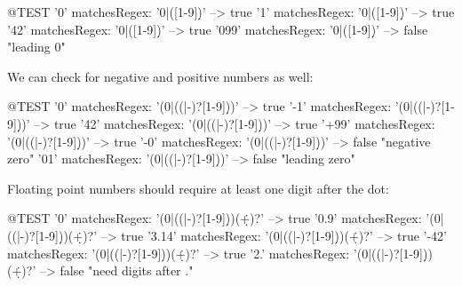\documentclass[a4paper,10pt,twoside]{book}
\begin{document}
{\begin{code}{@TEST}
'0' matchesRegex: '0|([1-9]\d*)'     --> true
'1' matchesRegex: '0|([1-9]\d*)'     --> true
'42' matchesRegex: '0|([1-9]\d*)'   --> true
'099' matchesRegex: '0|([1-9]\d*)' --> false    "leading 0"
\end{code}

We can check for negative and positive numbers as well:

\begin{code}{@TEST}
'0' matchesRegex: '(0|((\+|-)?[1-9]\d*))'     --> true
'-1' matchesRegex: '(0|((\+|-)?[1-9]\d*))'   --> true
'42' matchesRegex: '(0|((\+|-)?[1-9]\d*))'   --> true
'+99' matchesRegex: '(0|((\+|-)?[1-9]\d*))' --> true
'-0' matchesRegex: '(0|((\+|-)?[1-9]\d*))'   --> false    "negative zero"
'01' matchesRegex: '(0|((\+|-)?[1-9]\d*))'   --> false    "leading zero"
\end{code}

Floating point numbers should require at least one digit after the dot:

\begin{code}{@TEST}
'0' matchesRegex: '(0|((\+|-)?[1-9]\d*))(\.\d+)?'      --> true
'0.9' matchesRegex: '(0|((\+|-)?[1-9]\d*))(\.\d+)?'   --> true
'3.14' matchesRegex: '(0|((\+|-)?[1-9]\d*))(\.\d+)?' --> true
'-42' matchesRegex: '(0|((\+|-)?[1-9]\d*))(\.\d+)?'  --> true
'2.' matchesRegex: '(0|((\+|-)?[1-9]\d*))(\.\d+)?'     --> false    "need digits after ."
\end{code}


}
\end{document}
